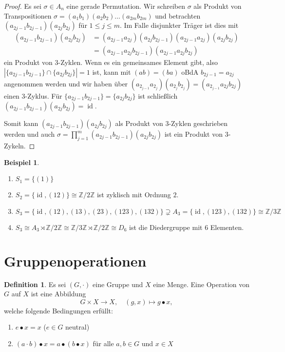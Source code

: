 \documentclass[12pt]{scrartcl} %
\DeclareMathOperator{\id}{id}
\newcommand\Z{\mathbb{Z}}
\theoremstyle{definition}
\newtheorem*{defn}{Definition}
\newtheorem{ex}{Beispiel}
\theoremstyle{remark}
\begin{document}
\begin{proof}
	Es sei $\sigma \in A_n$ eine gerade Permutation.
	Wir schreiben $\sigma$ als Produkt von Transpositionen $\sigma =(a_1b_1)(a_2b_2)\dots(a_{2m}b_{2m})$ und betrachten \((a_{2j-1}b_{2j-1})(a_{2j}b_{2j})\) für \(1 \leq j \leq m\).
	Im Falle disjunkter Träger ist dies mit
	\begin{align*}
		(a_{2j-1}b_{2j-1})(a_{2j}b_{2j}) &= (a_{2j-1}a_{2j})(a_{2j}b_{2j-1})(a_{2j-1}a_{2j})(a_{2j}b_{2j})\\
		&= (a_{2j-1}a_{2j}b_{2j-1})(a_{2j-1}a_{2j}b_{2j})
	\end{align*}
	ein Produkt von 3-Zyklen.
	Wenn es ein gemeinsames Element gibt, also \(|\{a_{2j-1}b_{2j-1}\}\cap\{a_{2j}b_{2j}\}| = 1\) ist, kann mit \((ab) = (ba)\) oBdA $b_{2j-1}=a_{2j}$ angenommen werden und wir haben über $(a_{2_{j-1}}a_{2_j})(a_{2_j}b_{2_j})=(a_{2_{j-1}}a_{2j}b_{2j})$ einen 3-Zyklus.
	Für \(\{a_{2j-1}b_{2j-1}\} = \{a_{2j}b_{2j}\}\) ist schließlich \((a_{2j-1}b_{2j-1})(a_{2j}b_{2j}) = \id\).

	Somit kann \((a_{2j-1}b_{2j-1})(a_{2j}b_{2j})\) als Produkt von 3-Zyklen geschrieben werden und auch \(\sigma = \prod_{j = 1}^m (a_{2j-1}b_{2j-1})(a_{2j}b_{2j})\) ist ein Produkt von 3-Zykeln.
\end{proof}
	
\begin{ex}
	\begin{enumerate}
	\item $S_1 = \{(1)\}$
	\item $S_2 = \{\id, (12)\} \cong \Z/2\Z$ ist zyklisch mit Ordnung \(2\).
	\item $S_3 = \{\id, (12), (13), (23), (123), (132)\} \supsetneq A_3=\{\id, (123), (132)\} \cong \Z/3\Z$
	\item $S_3 \cong A_3\rtimes \mathbb{Z}/2\mathbb{Z} \cong \mathbb{Z}/3\mathbb{Z} \rtimes \mathbb{Z}/2\mathbb{Z} \cong D_6$ ist die Diedergruppe mit 6 Elementen.
	\end{enumerate}
\end{ex}
	 
\section{Gruppenoperationen}

\begin{defn}
	Es sei $(G, \cdot)$ eine Gruppe und $X$ eine Menge.
	Eine Operation von \(G\) auf \(X\) ist eine Abbildung
	$$G \times X \rightarrow X, \quad (g,x) \mapsto g\bullet x,$$
	welche folgende Bedingungen erfüllt:
	\begin{enumerate}
	\item $e \bullet x = x$ ($e\in G$ neutral)
	\item \((a\cdot b)\bullet x = a\bullet (b\bullet x)\) für alle \(a,b\in G\) und \(x\in X\)
	\end{enumerate}
\end{defn}
\end{document}
